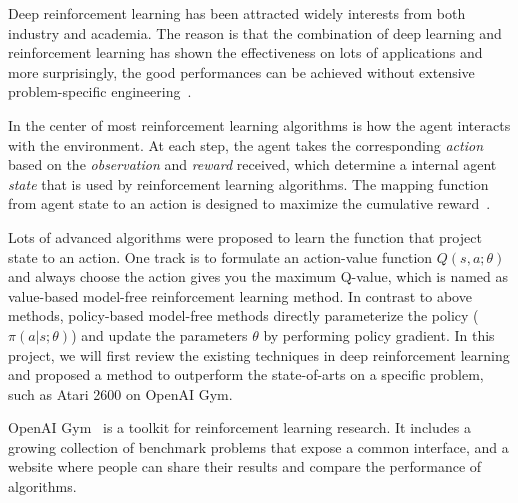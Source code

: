 

Deep reinforcement learning has been attracted widely interests from both
industry and academia. The reason is that the combination of deep learning and
reinforcement learning has shown the effectiveness on lots of applications
and more surprisingly, the good performances can be achieved without extensive
 problem-specific engineering~\cite{mnih2015human,silver2016mastering}.

In the center of most reinforcement learning algorithms is how the agent interacts
with the environment. At each step, the agent takes the corresponding \emph{action}
based on the \emph{observation} and \emph{reward} received, which determine a internal
agent \emph{state} that is used by reinforcement learning algorithms. The mapping function
from agent state to an action is designed to maximize the cumulative reward~\cite{sutton1998introduction}. 

Lots of advanced algorithms were proposed to learn the function that project
state to an action. One track is to formulate an action-value function $Q(s,a;
\theta)$ and always choose the action gives you the maximum Q-value, which is
named as value-based model-free reinforcement learning method. In contrast to
above methods, policy-based model-free methods directly parameterize the
policy ($\pi(a|s; \theta)$) and update the parameters $\theta$ by performing
policy gradient. In this project, we will first review the existing techniques in 
deep reinforcement learning and proposed a method to outperform the state-of-arts 
on a specific problem, such as Atari 2600 on OpenAI Gym.


OpenAI Gym~\cite{brockman2016openai} is a toolkit for reinforcement learning
research. It includes a growing collection of benchmark problems that expose a
common interface, and a website where people can share their results and
compare the performance of algorithms.
